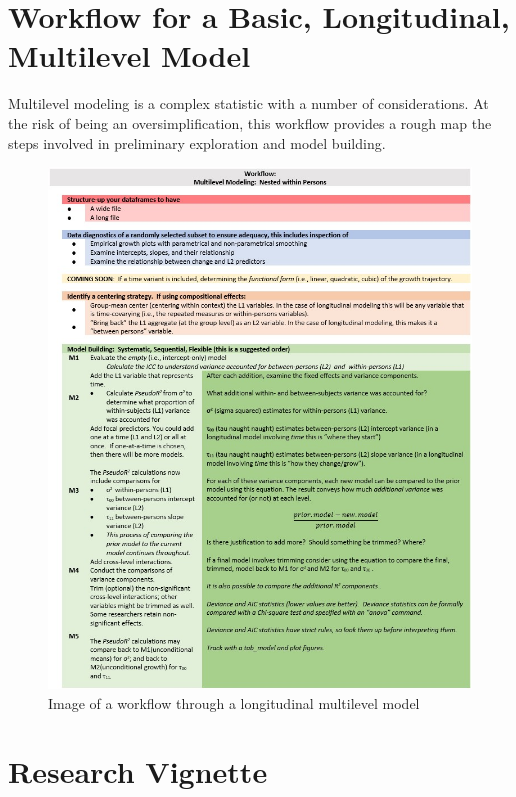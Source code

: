 \documentclass[
  english,
]{book}
\begin{document}
\hypertarget{workflow-for-a-basic-longitudinal-multilevel-model}{%
\section{Workflow for a Basic, Longitudinal, Multilevel Model}\label{workflow-for-a-basic-longitudinal-multilevel-model}}

Multilevel modeling is a complex statistic with a number of considerations. At the risk of being an oversimplification, this workflow provides a rough map the steps involved in preliminary exploration and model building.

\begin{figure}
\centering
\includegraphics{images/LongExpl/WrkFlowLong.jpg}
\caption{Image of a workflow through a longitudinal multilevel model}
\end{figure}

\hypertarget{research-vignette-2}{%
\section{Research Vignette}\label{research-vignette-2}}
\end{document}
